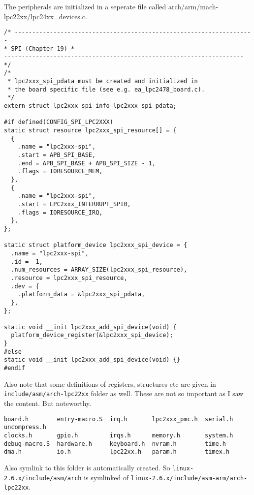 \documentclass{book}
\begin{document}
The peripherals are initialized in a seperate file called arch/arm/mach-lpc22xx/lpc24xx\_devices.c.
\begin{Verbatim}[fontsize=\footnotesize]
/* -------------------------------------------------------------------- 
* SPI (Chapter 19) * 
-------------------------------------------------------------------- */
/* 
 * lpc2xxx_spi_pdata must be created and initialized in 
 * the board specific file (see e.g. ea_lpc2478_board.c). 
 */ 
extern struct lpc2xxx_spi_info lpc2xxx_spi_pdata;

#if defined(CONFIG_SPI_LPC2XXX) 
static struct resource lpc2xxx_spi_resource[] = {
  { 
    .name = "lpc2xxx-spi", 
    .start = APB_SPI_BASE, 
    .end = APB_SPI_BASE + APB_SPI_SIZE - 1, 
    .flags = IORESOURCE_MEM, 
  }, 
  { 
    .name = "lpc2xxx-spi", 
    .start = LPC2xxx_INTERRUPT_SPI0, 
    .flags = IORESOURCE_IRQ, 
  },
}; 

static struct platform_device lpc2xxx_spi_device = { 
  .name = "lpc2xxx-spi", 
  .id = -1, 
  .num_resources = ARRAY_SIZE(lpc2xxx_spi_resource), 
  .resource = lpc2xxx_spi_resource, 
  .dev = { 
    .platform_data = &lpc2xxx_spi_pdata, 
  }, 
};

static void __init lpc2xxx_add_spi_device(void) { 
  platform_device_register(&lpc2xxx_spi_device); 
} 
#else 
static void __init lpc2xxx_add_spi_device(void) {} 
#endif 
\end{Verbatim}
Also note that some definitions of registers, structures etc are given in \texttt{include/asm/arch-lpc22xx} folder as well. These are not so important as I saw the content. But noteworthy.
\begin{Verbatim}[fontsize=\footnotesize]
board.h        entry-macro.S  irq.h       lpc2xxx_pmc.h  serial.h  uncompress.h
clocks.h       gpio.h         irqs.h      memory.h       system.h
debug-macro.S  hardware.h     keyboard.h  nvram.h        time.h
dma.h          io.h           lpc22xx.h   param.h        timex.h
\end{Verbatim}
Also symlink to this folder is automatically created. So \texttt{linux-2.6.x/include/asm/arch} is symlinked of \texttt{linux-2.6.x/include/asm-arm/arch-lpc22xx}.
\end{document}
